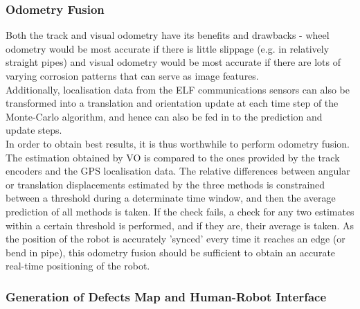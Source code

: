 \documentclass[11pt]{article}		%
\begin{document}
	\subsubsection{Odometry Fusion} \label{odometryFusion}
	Both the track and visual odometry have its benefits and drawbacks - wheel odometry would be most accurate if there is little slippage (e.g. in relatively straight pipes) and visual odometry would be most accurate if there are lots of varying corrosion patterns that can serve as image features.
	\\
    \hspace*{2ex}Additionally, localisation data from the ELF communications sensors can also be transformed into a translation and orientation update at each time step of the Monte-Carlo algorithm, and hence can also be fed in to the prediction and update steps.
	\\
	\hspace*{2ex}In order to obtain best results, it is thus worthwhile to perform odometry fusion. The estimation obtained by VO is compared to the ones provided by the track encoders and the GPS localisation data. The relative differences between angular or translation displacements estimated by the three methods is constrained between a threshold during a determinate time window, and then the average prediction of all methods is taken. If the check fails, a check for any two estimates within a certain threshold is performed, and if they are, their average is taken. As the position of the robot is accurately 'synced' every time it reaches an edge (or bend in pipe), this odometry fusion should be sufficient to obtain an accurate real-time positioning of the robot. 
	
	\subsubsection{Generation of Defects Map and Human-Robot Interface}
	
\end{document}
